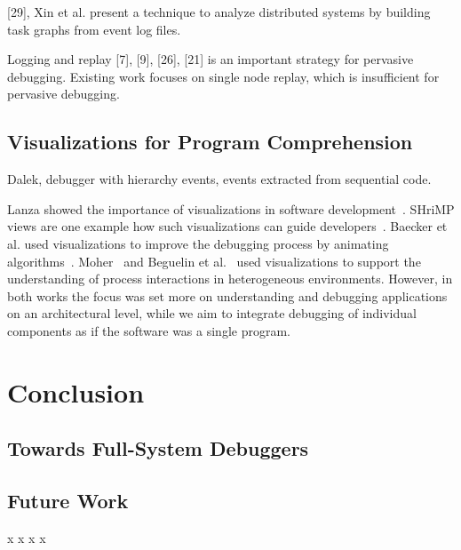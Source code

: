 [29], Xin et al. present a technique to analyze distributed systems
by building task graphs from event log files. 

Logging
and replay [7], [9], [26], [21] is an important strategy
for pervasive debugging. Existing work focuses on single
node replay, which is insufficient for pervasive debugging.





\section{Visualizations for Program Comprehension}
\label{sec:rw_visualization}

\cite{olsson91:sequential_debugging_at}
Dalek, debugger with hierarchy events, events extracted from sequential code.


Lanza showed the importance of visualizations in software development~\cite{lanza2003program}.
SHriMP views are one example how such visualizations can guide developers~\cite{storey2002shrimp}.
Baecker et al. used visualizations to improve the debugging process by animating algorithms~\cite{baecker1997software}.
Moher~\cite{moher1988provide} and Beguelin et al.~\cite{beguelin1993visualization} used visualizations to support the understanding of process interactions in heterogeneous environments.
However, in both works the focus was set more on understanding and debugging applications on an architectural level, while we aim to integrate debugging of individual components as if the software was a single program.


\chapter{Conclusion}
\label{sec:conclusion}

\section{Towards Full-System Debuggers}


\section{Future Work}

\newpage
x
\newpage
x
\newpage
x
\newpage
x
